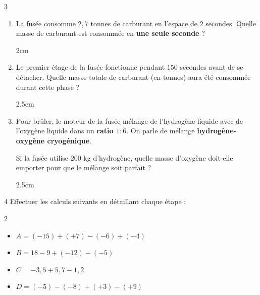 \documentclass[a4paper]{book}
\begin{document}
{\begin{exerciceNote}{3}
        \begin{enumerate}
            \item La fusée consomme $2,7$ tonnes de carburant en l'espace de $2$ secondes. 
            Quelle masse de carburant est consommée en \textbf{une seule seconde} ?
            
            \begin{ZoneReponse}{2cm}
            \end{ZoneReponse}
    
            \item Le premier étage de la fusée fonctionne pendant $150$ secondes avant de se détacher. 
            Quelle masse totale de carburant (en tonnes) aura été consommée durant cette phase ?
            
            \begin{ZoneReponse}{2.5cm}
            \end{ZoneReponse}

            \item Pour brûler, le moteur de la fusée mélange de l'hydrogène liquide avec de l'oxygène liquide dans un \textbf{ratio $1:6$}. On parle de mélange \textbf{hydrogène-oxygène cryogénique}.

            Si la fusée utilise $200$ kg d'hydrogène, quelle masse d'oxygène doit-elle emporter pour que le mélange soit parfait ?
            
            \begin{ZoneReponse}{2.5cm}
            \end{ZoneReponse}
        \end{enumerate}
    \end{exerciceNote}


\newpage

\setcounter{exo}{0}
\NomPrenom
{}

\TableauCompetencesQuatre
    {} %
    {} %
    {}   %
    {}   %

    \begin{exerciceNote}{4} %
        Effectuer les calculs suivants en détaillant chaque étape :
        
        \begin{multicols}{2}
            \begin{itemize}[label=\textbullet]
                \item $A = (-15) + (+7) - (-6) + (-4)$
                \item $B = 18 - 9 + (-12) - (-5)$
                \item $C = -3,5 + 5,7 - 1,2$
                \item $D = (-5) - (-8) + (+3) - (+9)$
            \end{itemize}
        \end{multicols}
        

\end{exerciceNote}}
\end{document}
